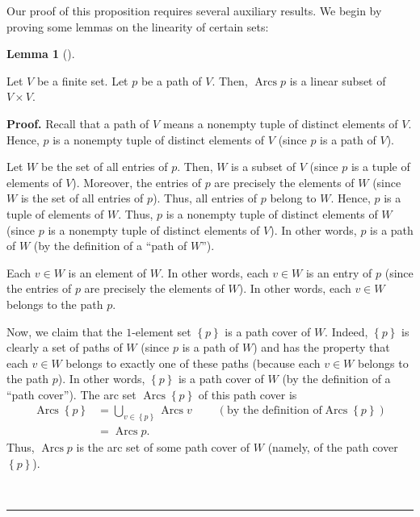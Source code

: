\documentclass[numbers=enddot,12pt,final,onecolumn,notitlepage]{scrartcl}%
\numberwithin{exer}{section}
\theoremstyle{definition}
\newtheorem{lem}[theo]{Lemma}
\newenvironment{lemma}[1][]
{\begin{lem}[#1]\begin{leftbar}}
{\end{leftbar}\end{lem}}
\newenvironment{proof}[1][Proof]{\noindent\textbf{#1.} }{\ \rule{0.5em}{0.5em}}
\let\cupnonlimits\bigcup
\renewcommand{\bigcup}{\cupnonlimits\limits}
\newenvironment{verlong}{}{}
\begin{document}
\begin{verlong}
Our proof of this proposition requires several auxiliary results. We begin by
proving some lemmas on the linearity of certain sets:

\begin{lemma}
\label{lem.linear.sub-of-path}Let $V$ be a finite set. Let $p$ be a path of
$V$. Then, $\operatorname*{Arcs}p$ is a linear subset of $V\times V$.
\end{lemma}

\begin{proof}
Recall that a path of $V$ means a nonempty tuple of distinct elements of $V$.
Hence, $p$ is a nonempty tuple of distinct elements of $V$ (since $p$ is a
path of $V$).

Let $W$ be the set of all entries of $p$. Then, $W$ is a subset of $V$ (since
$p$ is a tuple of elements of $V$). Moreover, the entries of $p$ are precisely
the elements of $W$ (since $W$ is the set of all entries of $p$). Thus, all
entries of $p$ belong to $W$. Hence, $p$ is a tuple of elements of $W$. Thus,
$p$ is a nonempty tuple of distinct elements of $W$ (since $p$ is a nonempty
tuple of distinct elements of $V$). In other words, $p$ is a path of $W$ (by
the definition of a \textquotedblleft path of $W$\textquotedblright).

Each $v\in W$ is an element of $W$. In other words, each $v\in W$ is an entry
of $p$ (since the entries of $p$ are precisely the elements of $W$). In other
words, each $v\in W$ belongs to the path $p$.

Now, we claim that the $1$-element set $\left\{  p\right\}  $ is a path cover
of $W$. Indeed, $\left\{  p\right\}  $ is clearly a set of paths of $W$ (since
$p$ is a path of $W$) and has the property that each $v\in W$ belongs to
exactly one of these paths (because each $v\in W$ belongs to the path $p$). In
other words, $\left\{  p\right\}  $ is a path cover of $W$ (by the definition
of a \textquotedblleft path cover\textquotedblright). The arc set
$\operatorname*{Arcs}\left\{  p\right\}  $ of this path cover is
\begin{align*}
\operatorname*{Arcs}\left\{  p\right\}   &  =\bigcup_{v\in\left\{  p\right\}
}\operatorname*{Arcs}v\ \ \ \ \ \ \ \ \ \ \left(  \text{by the definition of
}\operatorname*{Arcs}\left\{  p\right\}  \right) \\
&  =\operatorname*{Arcs}p.
\end{align*}
Thus, $\operatorname*{Arcs}p$ is the arc set of some path cover of $W$
(namely, of the path cover $\left\{  p\right\}  $).


\end{proof}
\end{verlong}
\end{document}
